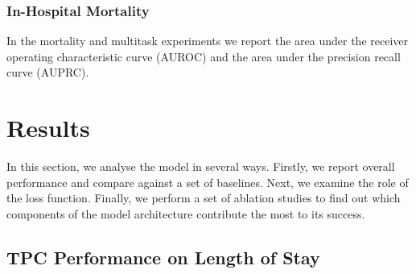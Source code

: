 \documentclass[sigconf]{acmart}
\begin{document}
\subsubsection{In-Hospital Mortality}In the mortality and multitask experiments we report the area under the receiver operating characteristic curve (AUROC) and the area under the precision recall curve (AUPRC).

\section{Results}
In this section, we analyse the model in several ways. Firstly, we report overall performance and compare against a set of baselines. Next, we examine the role of the loss function. Finally, we perform a set of ablation studies to find out which components of the model architecture contribute the most to its success.

\subsection{TPC Performance on Length of Stay}
\end{document}
